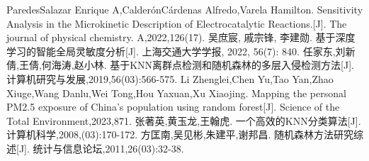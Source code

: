 \begin{thebibliography}{200}
    ParedesSalazar Enrique A,CalderónCárdenas Alfredo,Varela Hamilton. Sensitivity Analysis in the Microkinetic Description of Electrocatalytic Reactions.[J]. The journal of physical chemistry. A,2022,126(17).
    吴庶宸, 戚宗锋, 李建勋. 基于深度学习的智能全局灵敏度分析[J]. 上海交通大学学报, 2022, 56(7): 840.
    任家东,刘新倩,王倩,何海涛,赵小林. 基于KNN离群点检测和随机森林的多层入侵检测方法[J]. 计算机研究与发展,2019,56(03):566-575.
    Li Zhenglei,Chen Yu,Tao Yan,Zhao Xiuge,Wang Danlu,Wei Tong,Hou Yaxuan,Xu Xiaojing. Mapping the personal PM2.5 exposure of China's population using random forest[J]. Science of the Total Environment,2023,871.
    张著英,黄玉龙,王翰虎. 一个高效的KNN分类算法[J]. 计算机科学,2008,(03):170-172.
    方匡南,吴见彬,朱建平,谢邦昌. 随机森林方法研究综述[J]. 统计与信息论坛,2011,26(03):32-38.
\end{thebibliography} 